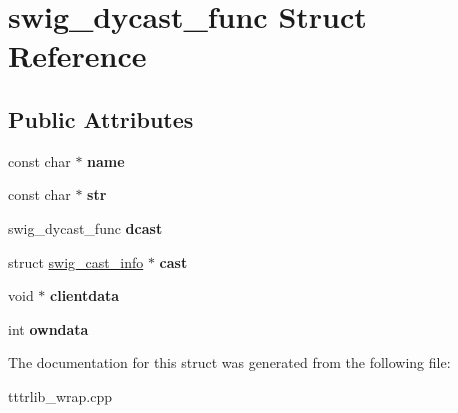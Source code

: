 \hypertarget{structswig__type__info}{}\section{swig\+\_\+dycast\+\_\+func Struct Reference}
\label{structswig__type__info}
\subsection*{Public Attributes}
\begin{DoxyCompactItemize}
\item 
\mbox{\label{structswig__type__info_ae3eaa19c439bb4aa2619141846cb1aa8}} 
const char $\ast$ {\bfseries name}
\item 
\mbox{\label{structswig__type__info_a95a8eb63ad5969a3a150a815c040d858}} 
const char $\ast$ {\bfseries str}
\item 
\mbox{\label{structswig__type__info_a6334047b1ade2bdb6769ec10ba7d9dee}} 
swig\+\_\+dycast\+\_\+func {\bfseries dcast}
\item 
\mbox{\label{structswig__type__info_abc79797047335dd61bc66b15769b11af}} 
struct \hyperlink{structswig__cast__info}{swig\+\_\+cast\+\_\+info} $\ast$ {\bfseries cast}
\item 
\mbox{\label{structswig__type__info_a1ecdd4b307ebe175e32cb602067202a8}} 
void $\ast$ {\bfseries clientdata}
\item 
\mbox{\label{structswig__type__info_a7bb9da65b9c934accf3c59ec0a81194d}} 
int {\bfseries owndata}
\end{DoxyCompactItemize}


The documentation for this struct was generated from the following file\+:\begin{DoxyCompactItemize}
\item 
tttrlib\+\_\+wrap.\+cpp\end{DoxyCompactItemize}
